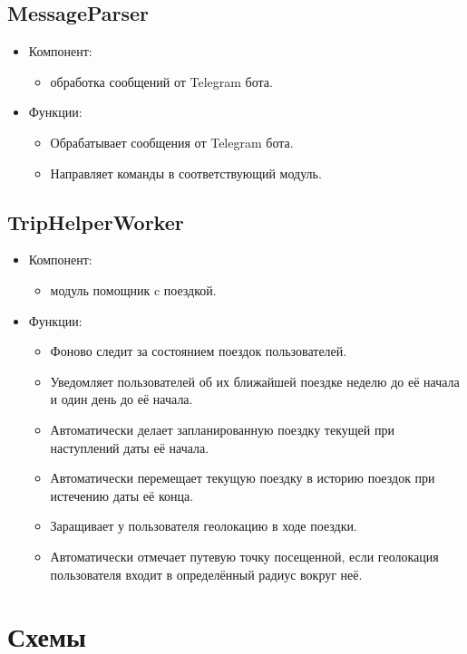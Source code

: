 \documentclass[areasetadvanced]{scrartcl}
\begin{document}
\subsection{MessageParser}
\begin{itemize}
  \item Компонент: 
  \begin{itemize}
    \item обработка сообщений от Telegram бота.
  \end{itemize} 
  \item Функции: 
  \begin{itemize}
    \item Обрабатывает сообщения от Telegram бота.
    \item Направляет команды в соответствующий модуль.
  \end{itemize}
\end{itemize}

\subsection{TripHelperWorker}
\begin{itemize}
  \item Компонент: 
  \begin{itemize}
    \item модуль помощник c поездкой.
  \end{itemize} 
  \item Функции: 
  \begin{itemize}
  \item Фоново следит за состоянием поездок пользователей.
  \item Уведомляет пользователей об их ближайшей поездке неделю до её
    начала и один день до её начала.
  \item Автоматически делает запланированную поездку текущей при
    наступлений даты её начала.
  \item Автоматически перемещает текущую поездку в историю поездок при
    истечению даты её конца.
  \item Заращивает у пользователя геолокацию в ходе поездки.
  \item Автоматически отмечает путевую точку посещенной, если геолокация
    пользователя входит в определённый радиус вокруг неё.
  \end{itemize}
\end{itemize}
\newpage

\section{Схемы}
\end{document}
